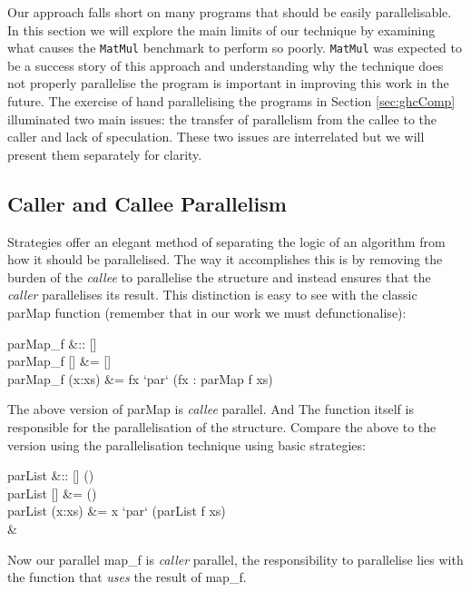 Our approach falls short on many programs that should be easily parallelisable.
In this section we will explore the main limits of our technique by examining
what causes the \verb|MatMul| benchmark to perform so poorly. \verb|MatMul| was
expected to be a success story of this approach and understanding why the
technique does not properly parallelise the program is important in improving
this work in the future. The exercise of hand parallelising the programs in
Section \ref{sec:ghcComp} illuminated two main issues: the transfer of parallelism
from the callee to the caller and lack of speculation. These two issues are interrelated
but we will present them separately for clarity.

\subsection{Caller and Callee Parallelism}

Strategies offer an elegant method of separating the logic of an algorithm from
how it should be parallelised. The way it accomplishes this is by removing the
burden of the \emph{callee} to parallelise the structure and instead ensures
that the \emph{caller} parallelises its result. This distinction is easy to see
with the classic \<parMap\> function (remember that in our work we must
defunctionalise):

\begin{haskell}
parMap_{f} &:: [\hasalpha] \to [\hasbeta] \\
parMap_{f} []     &= [] \\
parMap_{f} (x:xs) &= fx `par` (fx : parMap f xs) 
\end{haskell}

The above version of \<parMap\> is \emph{callee} parallel. And The function itself is
responsible for the parallelisation of the structure. Compare the above to the
version using the parallelisation technique using basic strategies:

\begin{haskell}
parList &:: [\hasalpha] \to () \\
parList []     &= () \\
parList (x:xs) &= x `par` (parList f xs)\\
\quad & \quad \\
\end{haskell}

Now our parallel \<map_{f}\> is \emph{caller} parallel, the responsibility to
parallelise lies with the function that \emph{uses} the result of \<map_{f}\>.

